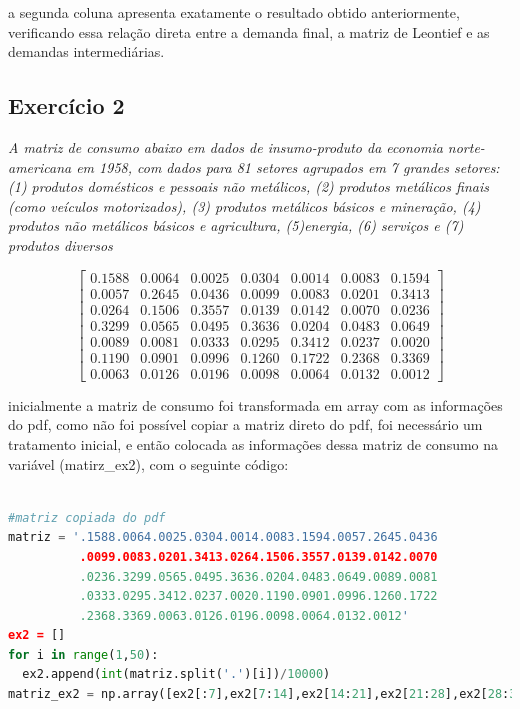 \documentclass[a4paper, 12pt]{article}
\begin{document}
a segunda coluna apresenta exatamente o resultado obtido anteriormente, verificando essa relação direta entre a demanda final, a matriz de Leontief e as demandas intermediárias.

\subsection{Exercício 2}

\textit{A matriz de consumo abaixo em dados de insumo-produto da economia norte-americana em 1958, com dados para 81 setores agrupados em 7 grandes setores: (1) produtos domésticos e pessoais não metálicos, (2) produtos metálicos finais (como veículos motorizados), (3) produtos metálicos básicos e mineração, (4) produtos não metálicos básicos e agricultura, (5)energia, (6) serviços e (7) produtos diversos}

$$\begin{bmatrix}
0.1588 & 0.0064 & 0.0025 & 0.0304 & 0.0014 & 0.0083 & 0.1594 \\
0.0057 & 0.2645 & 0.0436 & 0.0099 & 0.0083 & 0.0201 & 0.3413 \\
0.0264 & 0.1506 & 0.3557 & 0.0139 & 0.0142 & 0.0070 & 0.0236 \\
0.3299 & 0.0565 & 0.0495 & 0.3636 & 0.0204 & 0.0483 & 0.0649 \\
0.0089 & 0.0081 & 0.0333 & 0.0295 & 0.3412 & 0.0237 & 0.0020 \\
0.1190 & 0.0901 & 0.0996 & 0.1260 & 0.1722 & 0.2368 & 0.3369 \\
0.0063 & 0.0126 & 0.0196 & 0.0098 & 0.0064 & 0.0132 & 0.0012
\end{bmatrix}$$

inicialmente a matriz de consumo foi transformada em array com as informações do pdf, como não foi possível copiar a matriz direto do pdf, foi necessário um tratamento inicial, e então colocada as informações dessa matriz de consumo na variável (matirz\_ex2), com o seguinte código:

\begin{lstlisting}[language=Python, caption=Criação matriz\_ex2, label=listing_matriz_ex2]

#matriz copiada do pdf
matriz = '.1588.0064.0025.0304.0014.0083.1594.0057.2645.0436
          .0099.0083.0201.3413.0264.1506.3557.0139.0142.0070
          .0236.3299.0565.0495.3636.0204.0483.0649.0089.0081
          .0333.0295.3412.0237.0020.1190.0901.0996.1260.1722
          .2368.3369.0063.0126.0196.0098.0064.0132.0012'
ex2 = []
for i in range(1,50):
  ex2.append(int(matriz.split('.')[i])/10000)
matriz_ex2 = np.array([ex2[:7],ex2[7:14],ex2[14:21],ex2[21:28],ex2[28:35],ex2[35:42],ex2[42:]])

 \end{lstlisting}
 
\end{document}
